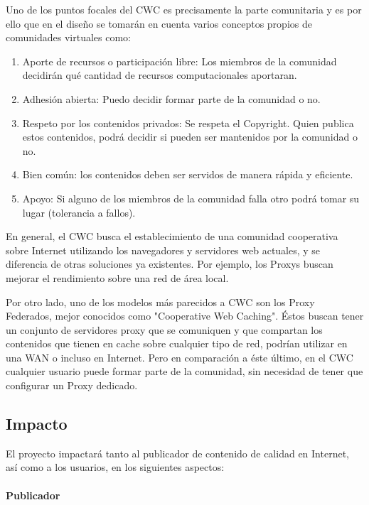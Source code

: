 Uno de los puntos focales del CWC es precisamente la parte comunitaria y es por ello que en el diseño se tomarán en cuenta varios conceptos propios de comunidades virtuales como: 

\begin{enumerate}
\item Aporte de recursos o participación libre: Los miembros de la comunidad decidirán qué cantidad de recursos computacionales aportaran.
\item Adhesión abierta: Puedo decidir formar parte de la comunidad o no.
\item Respeto por los contenidos privados: Se respeta el Copyright. Quien publica estos contenidos, podrá decidir si pueden ser mantenidos por la comunidad o no.
\item Bien común: los contenidos deben ser servidos de manera rápida y eficiente.
\item Apoyo: Si alguno de los miembros de la comunidad falla otro podrá tomar su lugar (tolerancia a fallos).
\end{enumerate}

En general, el CWC busca el establecimiento de una comunidad cooperativa sobre Internet utilizando los navegadores y servidores web actuales, y se diferencia de otras soluciones ya existentes. Por ejemplo, los Proxys buscan mejorar el rendimiento sobre una red de área local. 

Por otro lado, uno de los modelos más parecidos a CWC son los Proxy Federados, mejor conocidos como "Cooperative Web Caching". Éstos buscan tener un conjunto de servidores proxy que se comuniquen y que compartan los contenidos que tienen en cache sobre cualquier tipo de red, podrían utilizar en una WAN o incluso en Internet. Pero en comparación a éste último, en el CWC cualquier usuario puede formar parte de la comunidad, sin necesidad de tener que configurar un Proxy dedicado.


\subsection{Impacto}


El proyecto impactará tanto al publicador de contenido de calidad en Internet, así como a los usuarios, en los siguientes aspectos:

\paragraph{Publicador}


